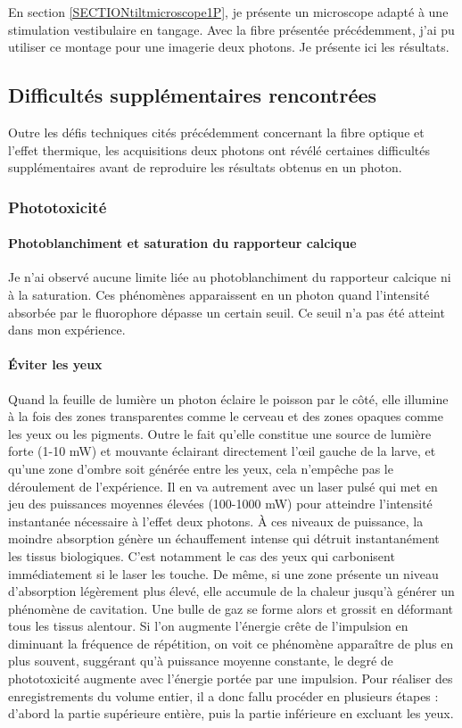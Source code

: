 En section \ref{SECTIONtiltmicroscope1P}, je présente un microscope adapté à une stimulation vestibulaire en tangage. Avec la fibre présentée précédemment, j'ai pu utiliser ce montage pour une imagerie deux photons. Je présente ici les résultats.

\subsection{Difficultés supplémentaires rencontrées}

Outre les défis techniques cités précédemment concernant la fibre optique et l'effet thermique, les acquisitions deux photons ont révélé certaines difficultés supplémentaires avant de reproduire les résultats obtenus en un photon.

\subsubsection{Phototoxicité}

\paragraph{Photoblanchiment et saturation du rapporteur calcique}
Je n'ai observé aucune limite liée au photoblanchiment du rapporteur calcique ni à la saturation. Ces phénomènes apparaissent en un photon quand l'intensité absorbée par le fluorophore dépasse un certain seuil. Ce seuil n'a pas été atteint dans mon expérience.

\paragraph{Éviter les yeux}
Quand la feuille de lumière un photon éclaire le poisson par le côté, elle illumine à la fois des zones transparentes comme le cerveau et des zones opaques comme les yeux ou les pigments. Outre le fait qu'elle constitue une source de lumière forte (1-10 mW) et mouvante éclairant directement l'œil gauche de la larve, et qu'une zone d'ombre soit générée entre les yeux, cela n'empêche pas le déroulement de l'expérience. Il en va autrement avec un laser pulsé qui met en jeu des puissances moyennes élevées (100-1000 mW) pour atteindre l'intensité instantanée nécessaire à l'effet deux photons. À ces niveaux de puissance, la moindre absorption génère un échauffement intense qui détruit instantanément les tissus biologiques. C'est notamment le cas des yeux qui carbonisent immédiatement si le laser les touche. De même, si une zone présente un niveau d'absorption légèrement plus élevé, elle accumule de la chaleur jusqu'à générer un phénomène de cavitation. Une bulle de gaz se forme alors et grossit en déformant tous les tissus alentour. Si l'on augmente l'énergie crête de l'impulsion en diminuant la fréquence de répétition, on voit ce phénomène apparaître de plus en plus souvent, suggérant qu'à puissance moyenne constante, le degré de phototoxicité augmente avec l'énergie portée par une impulsion. Pour réaliser des enregistrements du volume entier, il a donc fallu procéder en plusieurs étapes : d'abord la partie supérieure entière, puis la partie inférieure en excluant les yeux. 

